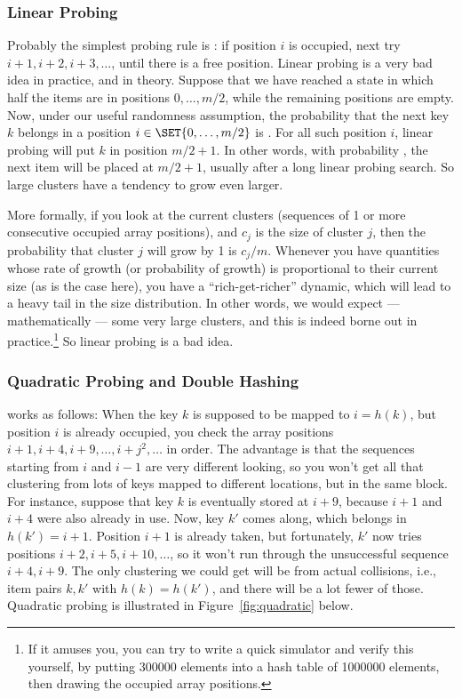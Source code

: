 \subsubsection{Linear Probing}
Probably the simplest probing rule is : if
position $i$ is occupied, next try $i+1, i+2, i+3, \ldots$, until
there is a free position. 
Linear probing is a very bad idea in practice, and in theory.
Suppose that we have reached a state in which half the items are
in positions $0, \ldots, m/2$, while the remaining positions are
empty. Now, under our useful randomness assumption, the probability
that the next key $k$ belongs in a position $i \in \SET{0, \ldots, m/2}$
is \half. 
For all such position $i$, linear probing will put $k$ in position
$m/2+1$. In other words, with probability \half, the next item will be
placed at $m/2+1$, usually after a long linear probing search. So large
clusters have a tendency to grow even larger.

More formally, if you look at the current clusters (sequences of 1 or
more consecutive occupied array positions), and $c_j$ is the size of
cluster $j$, then the probability that cluster $j$ will grow by 1 is
$c_j/m$. Whenever you have quantities whose rate of growth (or
probability of growth) is proportional to their current size (as is
the case here), you have a ``rich-get-richer'' dynamic, which will
lead to a heavy tail in the size distribution. In other words, we
would expect --- mathematically --- some very large clusters, and this
is indeed borne out in practice.\footnote{If it amuses you, you can
  try to write a quick simulator and verify this yourself, by putting
  300000 elements into a hash table of 1000000 elements, then drawing
  the occupied array positions.}
So linear probing is a bad idea.

\subsubsection{Quadratic Probing and Double Hashing}
 works as follows:
When the key $k$ is supposed to be mapped to $i=h(k)$, but position
$i$ is already occupied, you check the array positions
$i+1, i+4, i+9, \ldots, i+j^2, \ldots$ in order. The advantage is that
the sequences starting from $i$ and $i-1$ are very different looking,
so you won't get all that clustering from lots of keys mapped to
different locations, but in the same block. For instance, suppose that
key $k$ is eventually stored at $i+9$, because $i+1$ and $i+4$ were
also already in use.
Now, key $k'$ comes along, which belongs in $h(k') = i+1$. Position
$i+1$ is already taken, but fortunately, $k'$ now tries positions
$i+2, i+5, i+10, \ldots$, so it won't run through the unsuccessful
sequence $i+4, i+9$. The only clustering we could get will be from
actual collisions, i.e., item pairs $k,k'$ with $h(k)=h(k')$, and
there will be a lot fewer of those. Quadratic probing is illustrated
in Figure~\ref{fig:quadratic} below.

